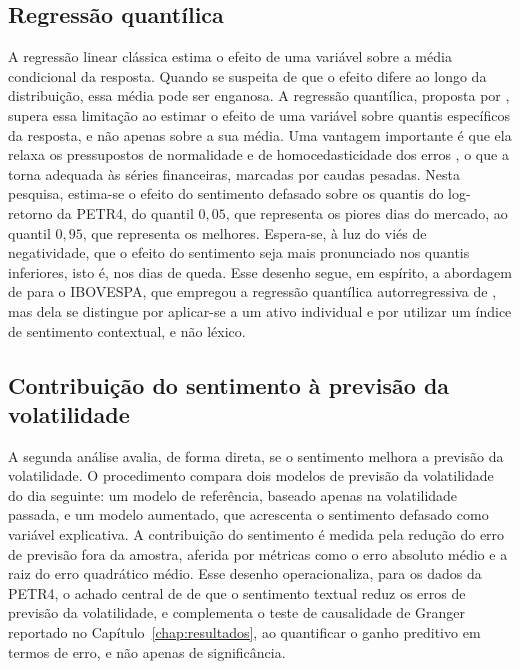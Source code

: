 \subsection{Regressão quantílica}

A regressão linear clássica estima o efeito de uma variável sobre a média condicional da resposta. Quando se suspeita de que o efeito difere ao longo da distribuição, essa média pode ser enganosa. A regressão quantílica, proposta por , supera essa limitação ao estimar o efeito de uma variável sobre quantis específicos da resposta, e não apenas sobre a sua média. Uma vantagem importante é que ela relaxa os pressupostos de normalidade e de homocedasticidade dos erros \cite{koenker_quantile_2005}, o que a torna adequada às séries financeiras, marcadas por caudas pesadas. Nesta pesquisa, estima-se o efeito do sentimento defasado sobre os quantis do log-retorno da PETR4, do quantil $0{,}05$, que representa os piores dias do mercado, ao quantil $0{,}95$, que representa os melhores. Espera-se, à luz do viés de negatividade, que o efeito do sentimento seja mais pronunciado nos quantis inferiores, isto é, nos dias de queda. Esse desenho segue, em espírito, a abordagem de  para o IBOVESPA, que empregou a regressão quantílica autorregressiva de , mas dela se distingue por aplicar-se a um ativo individual e por utilizar um índice de sentimento contextual, e não léxico.

\subsection{Contribuição do sentimento à previsão da volatilidade}

A segunda análise avalia, de forma direta, se o sentimento melhora a previsão da volatilidade. O procedimento compara dois modelos de previsão da volatilidade do dia seguinte: um modelo de referência, baseado apenas na volatilidade passada, e um modelo aumentado, que acrescenta o sentimento defasado como variável explicativa. A contribuição do sentimento é medida pela redução do erro de previsão fora da amostra, aferida por métricas como o erro absoluto médio e a raiz do erro quadrático médio. Esse desenho operacionaliza, para os dados da PETR4, o achado central de  de que o sentimento textual reduz os erros de previsão da volatilidade, e complementa o teste de causalidade de Granger reportado no Capítulo~\ref{chap:resultados}, ao quantificar o ganho preditivo em termos de erro, e não apenas de significância.


